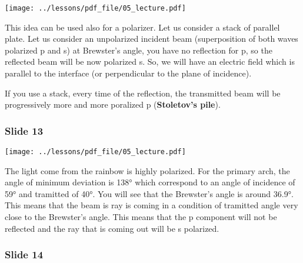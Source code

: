 \documentclass[../main/main.tex]{subfiles}
\begin{document}
\begin{minipage}[]{0.5\linewidth}
\centering
\texttt{[image: ../lessons/pdf\_file/05\_lecture.pdf]}
\end{minipage}
\hspace{0.3cm}\vspace{0.3cm}
\begin{minipage}[c]{0.47\linewidth}

This idea can be used also for a polarizer. Let us consider a stack of parallel plate. Let us consider an unpolarized incident beam (superposition of both waves polarized p and s) at Brewster's angle, you have no reflection for p, so the reflected beam will be now polarized s. So, we will have an electric field which is parallel to the interface (or perpendicular to the plane of incidence).

If you use a stack, every time of the reflection, the transmitted beam will be progressively more and more poralized p (\textbf{Stoletov's pile}).

\end{minipage}

\subsubsection*{Slide 13}

\begin{minipage}[]{0.5\linewidth}
\centering
\texttt{[image: ../lessons/pdf\_file/05\_lecture.pdf]}
\end{minipage}
\hspace{0.3cm}\vspace{0.3cm}
\begin{minipage}[c]{0.47\linewidth}

The light come from the rainbow is highly polarized. For the primary arch, the angle of minimum deviation is 138° which correspond to an angle of incidence of 59° and tramitted of 40°. You will see that the Brewster's angle is around 36.9°. This means that the beam is ray is coming in a condition of tramitted angle very close to the Brewster's angle. This means that the p component will not be reflected and the ray that is coming out will be s polarized.

\end{minipage}

\subsubsection*{Slide 14}
\end{document}
